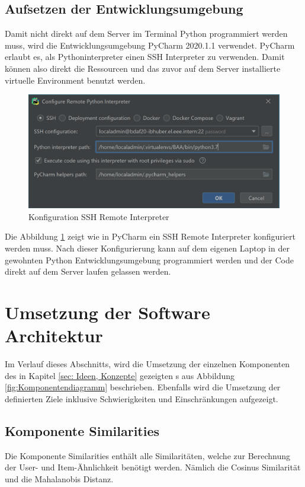 \subsection{Aufsetzen der Entwicklungsumgebung}
Damit nicht direkt auf dem Server im Terminal Python programmiert werden muss, wird die Entwicklungsumgebung PyCharm 2020.1.1 %
verwendet. PyCharm erlaubt es, als Pythoninterpreter einen SSH Interpreter zu verwenden. Damit können also direkt die Ressourcen und das zuvor auf dem Server installierte virtuelle Environment benutzt werden.
\begin{figure}[htb]
	\centering
	\includegraphics[keepaspectratio,width=\linewidth]{img/SSH Remote Interpreter Configuration.png}
	\caption{Konfiguration SSH Remote Interpreter}
	\label{fig:SSH Remote Interpreter}
\end{figure}

Die Abbildung \ref{fig:SSH Remote Interpreter} zeigt wie in PyCharm ein SSH Remote Interpreter konfiguriert werden muss. Nach dieser Konfigurierung kann auf dem eigenen Laptop in der gewohnten Python Entwicklungsumgebung programmiert werden und der Code direkt auf dem Server laufen gelassen werden.

\section{Umsetzung der Software Architektur}
Im Verlauf dieses Abschnitts, wird die Umsetzung der einzelnen Komponenten des in Kapitel \ref{sec: Ideen, Konzepte} gezeigten s aus Abbildung \ref{fig:Komponentendiagramm} beschrieben. Ebenfalls wird die Umsetzung der definierten Ziele inklusive Schwierigkeiten und Einschränkungen aufgezeigt.

\subsection{Komponente Similarities}
Die Komponente Similarities enthält alle Similaritäten, welche zur Berechnung der User- und Item-Ähnlichkeit benötigt werden. Nämlich die Cosinus Similarität und die Mahalanobis Distanz.

